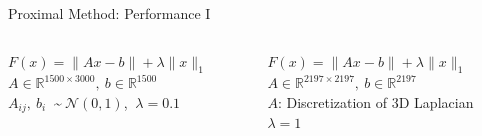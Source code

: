 \documentclass[10pt]{beamer}
\begin{document}
   \begin{frame}{Proximal Method: Performance I}
   	\begin{columns}[T]
   		\begin{column}{.5\textwidth}
   			$F(x) = \lVert Ax - b \rVert + \lambda \lVert x \rVert_1$\\
   			$A \in \mathbb{R}^{1500 \times 3000},\:b \in \mathbb{R}^{1500}$\\
   			$A_{ij},\:b_i\:$ \textasciitilde $\:\mathcal{N}(0,1)$, $\:\lambda = 0.1$\\
   			\vspace{15pt}
   			\resizebox{\linewidth}{!}{}
   			\begin{center}
   				\hspace{-3pt}
   			\end{center}
   		
   		\end{column}\hfill
   		\begin{column}{.5\textwidth}
   			$F(x) = \lVert Ax - b \rVert + \lambda \lVert x \rVert_1$\\
   			$A \in \mathbb{R}^{2197 \times 2197},\:b \in \mathbb{R}^{2197}$\\
   			$A$: \small Discretization of 3D Laplacian\\
   			\normalsize$\lambda = 1$\\
   			\vspace{8pt}
   			\resizebox{\linewidth}{!}{}
   			\begin{center}
   				\hspace{5pt}
   			\end{center}
   		\end{column}
   	\end{columns}
   \end{frame}
   
\end{document}

